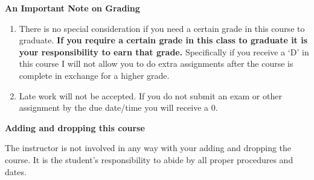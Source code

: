 \documentclass{article}
\begin{document}
\vspace*{5pt}
\begin{center}
{\bf An Important Note on Grading}
\end{center}
\begin{enumerate}
\item  There is no special consideration if you need a certain grade in this course to graduate.  {\bf If you require a certain grade in this class to graduate it is your responsibility to earn that grade.} Specifically if you receive a `D' in this course I will not allow you to do extra assignments after the course is complete in exchange for a higher grade.
\item  Late work will not be accepted.  If you do not submit an exam or other assignment by the due date/time you will receive a 0.
\end{enumerate}
\begin{center}
{\bf Adding and dropping this course}
\end{center}
The instructor is not involved in any way with your adding and dropping the course.  It is the student's responsibility to abide by all proper procedures and dates.  \\
\end{document}
